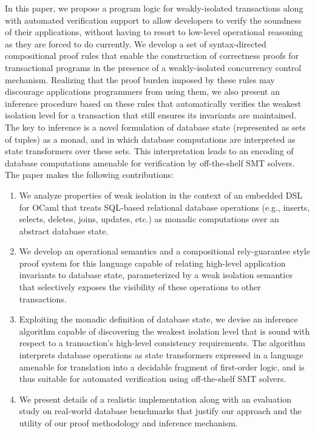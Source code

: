 In this paper, we propose a program logic for weakly-isolated
transactions along with automated verification support to allow
developers to verify the soundness of their applications, without
having to resort to low-level operational reasoning as they are forced
to do currently.  We develop a set of syntax-directed compositional
proof rules that enable the construction of correctness proofs for
transactional programs in the presence of a weakly-isolated
concurrency control mechanism.  Realizing that the proof burden
imposed by these rules may discourage applications programmers from
using them, we also present an inference procedure based on these
rules that automatically verifies the weakest isolation level for a
transaction that still ensures its invariants are maintained.  The key
to inference is a novel formulation of database state (represented as
sets of tuples) as a monad, and in which database computations are
interpreted as state transformers over these sets.  This
interpretation leads to an encoding of database computations amenable
for verification by off-the-shelf SMT solvers.  The paper makes the
following contributions:
\begin{enumerate}
\item We analyze properties of weak isolation in the context of an
    embedded DSL for OCaml that treats SQL-based relational database
    operations (e.g., inserts, selects, deletes, joins, updates, etc.)
    as monadic computations over an abstract database state.
 \item We develop an operational semantics and a compositional
   rely-guarantee style proof system for this language capable of
   relating high-level application invariants to database state,
   parameterized by a weak isolation semantics that selectively
   exposes the visibility of these operations to other transactions.
 \item Exploiting the monadic definition of database state, we devise
   an inference algorithm capable of discovering the weakest isolation
   level that is sound with respect to a transaction's high-level
   consistency requirements.  The algorithm interprets database
   operations as state transformers expressed in a language amenable
   for translation into a decidable fragment of first-order logic, and
   is thus suitable for automated verification using off-the-shelf SMT
   solvers.
 \item We present details of a realistic implementation along with an
   evaluation study on real-world database benchmarks that justify our
   approach and the utility of our proof methodology and inference
   mechanism.
\end{enumerate}
